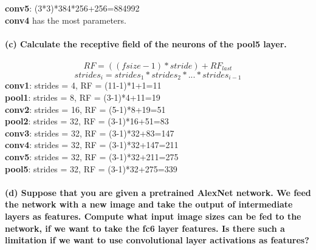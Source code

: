 \documentclass[12pt]{article}
\begin{document}
	\textbf{conv5}: (3*3)*384*256+256=884992\\
	\textbf{conv4} has the most parameters.\\
	\\
	\noindent
	\textbf{(c) Calculate the receptive field of the neurons of the pool5 layer.}\\
	\\
	$$RF = ((fsize-1)*stride)+RF_{last}$$
	$$strides_i = strides_1 * strides_2 * ... * strides_{i-1}$$
	\textbf{conv1}: strides = 4,  RF = (11-1)*1+1=11\\
	\textbf{pool1}: strides = 8,  RF = (3-1)*4+11=19\\
	\textbf{conv2}: strides = 16, RF = (5-1)*8+19=51\\
	\textbf{pool2}: strides = 32, RF = (3-1)*16+51=83\\
	\textbf{conv3}: strides = 32, RF = (3-1)*32+83=147\\
	\textbf{conv4}: strides = 32, RF = (3-1)*32+147=211\\
	\textbf{conv5}: strides = 32, RF = (3-1)*32+211=275\\
	\textbf{pool5}: strides = 32, RF = (3-1)*32+275=339\\
	\\
	\noindent
	\textbf{(d) Suppose that you are given a pretrained AlexNet network. We feed the network with a new image and take the output of intermediate layers as features. Compute what input image sizes can be fed to the network, if we want to take the fc6 layer features. Is there such a limitation if we want to use convolutional layer activations as features?}\\
	\\
	
	
\end{document}
